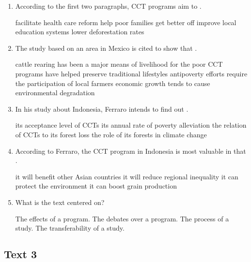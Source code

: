 \begin{enumerate}[resume]
	\item
According to the first two paragraphs, CCT programs aim to \lineread.


\fourchoices
{facilitate health care reform}
{help poor families get better off}
{improve local education systems}
{lower deforestation rates}


\item
 The study based on an area in Mexico is cited to show that \lineread.


\fourchoices
{cattle rearing has been a major means of livelihood for the poor}
{CCT programs have helped preserve traditional lifestyles}
{antipoverty efforts require the participation of local farmers}
{economic growth tends to cause environmental degradation}



\item
 In his study about Indonesia, Ferraro intends to find out \lineread.


\fourchoices
{its acceptance level of CCTs}
{its annual rate of poverty alleviation}
{the relation of CCTs to its forest loss}
{the role of its forests in climate change}



\item
According to Ferraro, the CCT program in Indonesia is most valuable
in that \lineread.


\fourchoices
{it will benefit other Asian countries}
{it will reduce regional inequality}
{it can protect the environment}
{it can boost grain production}


\item
What is the text centered on?


\fourchoices
{The effects of a program.}
{The debates over a program.}
{The process of a study.}
{The transferability of a study.	}

	
\end{enumerate}




\newpage
\subsection{Text 3}



